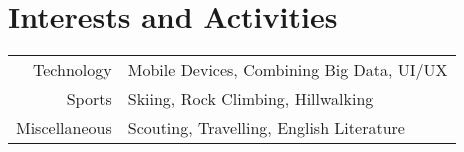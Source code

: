 \documentclass[a4paper,10pt]{article}
\begin{document}
\section{Interests and Activities}
\begin{tabular}{r|p{11cm}}
Technology & Mobile Devices, Combining Big Data, UI/UX\\
Sports & Skiing, Rock Climbing, Hillwalking\\
Miscellaneous & Scouting, Travelling, English Literature
\end{tabular}
\end{document}
